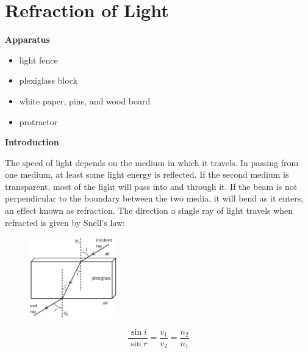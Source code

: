 
\section{Refraction of Light}

\makelabheader %



\bigskip
\textbf{Apparatus} 

\begin{itemize}[nosep]
\item light fence 
\item plexiglass block 
\item white paper, pins, and wood board 
\item protractor
\end{itemize}

\textbf{Introduction}

The speed of light depends on the medium in which it travels. In passing
from one medium, at least some light energy is reflected. If the second
medium is transparent, most of the light will pass into and through
it. If the beam is not perpendicular to the boundary between the two
media, it will bend as it enters, an effect known as refraction. The
direction a single ray of light travels when refracted is given by
Snell's law:
\begin{figure}
\begin{raggedleft}
\vspace{0.1in}
\includegraphics[width=0.34\textwidth]{refraction_of_light/plexiglass_figure.eps}

\end{raggedleft}
\end{figure}
\begin{displaymath} \frac{\sin i}{\sin r} = \frac{v_1}{v_2} = \frac{n_2}{n_1} \end{displaymath}


